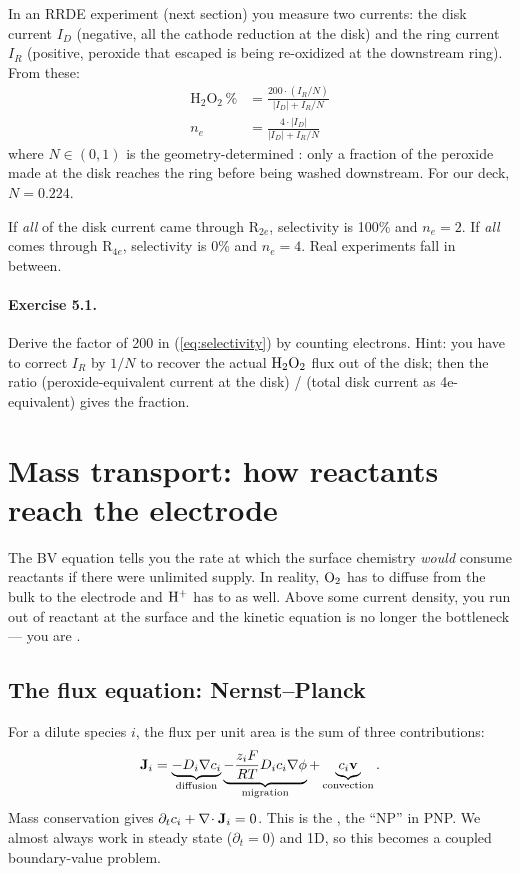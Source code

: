 \documentclass[11pt]{article}
\begin{document}
In an RRDE experiment (next section) you measure two currents: the
disk current $I_D$ (negative, all the cathode reduction at the disk)
and the ring current $I_R$ (positive, peroxide that escaped is being
re-oxidized at the downstream ring). From these:
\begin{align}
  \mathrm{H_2O_2}\,\% &= \frac{200 \cdot (I_R / N)}{|I_D| + I_R/N} \label{eq:selectivity}\\
  n_e &= \frac{4 \cdot |I_D|}{|I_D| + I_R/N}
\end{align}
where $N \in (0,1)$ is the geometry-determined
: only a fraction of the peroxide
made at the disk reaches the ring before being washed downstream.
For our deck, $N = 0.224$.

If \emph{all} of the disk current came through R$_{2e}$,
selectivity is 100\% and $n_e = 2$. If \emph{all} comes through
R$_{4e}$, selectivity is 0\% and $n_e = 4$. Real experiments fall
in between.

\paragraph{Exercise 5.1.} Derive the factor of 200 in
(\ref{eq:selectivity}) by counting electrons. Hint: you have to
correct $I_R$ by $1/N$ to recover the actual $\mathrm{H_2O_2}$ flux out
of the disk; then the ratio (peroxide-equivalent current at the
disk) / (total disk current as 4e-equivalent) gives the fraction.

\section{Mass transport: how reactants reach the electrode}

The BV equation tells you the rate at which the surface chemistry
\textit{would} consume reactants if there were unlimited supply. In
reality, $\mathrm{O_2}$ has to diffuse from the bulk to the electrode and
$\mathrm{H^+}$ has to as well. Above some current density, you run out of
reactant at the surface and the kinetic equation is no longer the
bottleneck --- you are .

\subsection{The flux equation: Nernst--Planck}

For a dilute species $i$, the flux per unit area is the sum of three
contributions:
\begin{equation}
  \mathbf{J}_i = \underbrace{-D_i \nabla c_i}_{\text{diffusion}}
                 \underbrace{- \frac{z_i F}{RT}D_i c_i \nabla\phi}_{\text{migration}}
                 + \underbrace{c_i \mathbf{v}}_{\text{convection}}.
  \label{eq:np}
\end{equation}
Mass conservation gives $\partial_t c_i + \nabla\!\cdot \mathbf{J}_i = 0$.
This is the , the ``NP'' in PNP.
We almost always work in steady state ($\partial_t = 0$) and 1D, so
this becomes a coupled boundary-value problem.
\end{document}
